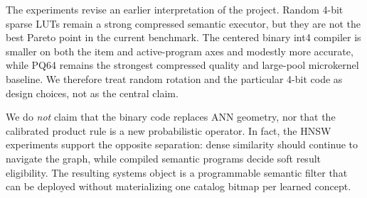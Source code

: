 The experiments revise an earlier interpretation of the project. Random 4-bit sparse LUTs remain a strong compressed semantic executor, but they are not the best Pareto point in the current benchmark. The centered binary int4 compiler is smaller on both the item and active-program axes and modestly more accurate, while PQ64 remains the strongest compressed quality and large-pool microkernel baseline. We therefore treat random rotation and the particular 4-bit code as design choices, not as the central claim.

We do \emph{not} claim that the binary code replaces ANN geometry, nor that the calibrated product rule is a new probabilistic operator. In fact, the HNSW experiments support the opposite separation: dense similarity should continue to navigate the graph, while compiled semantic programs decide soft result eligibility. The resulting systems object is a programmable semantic filter that can be deployed without materializing one catalog bitmap per learned concept.
